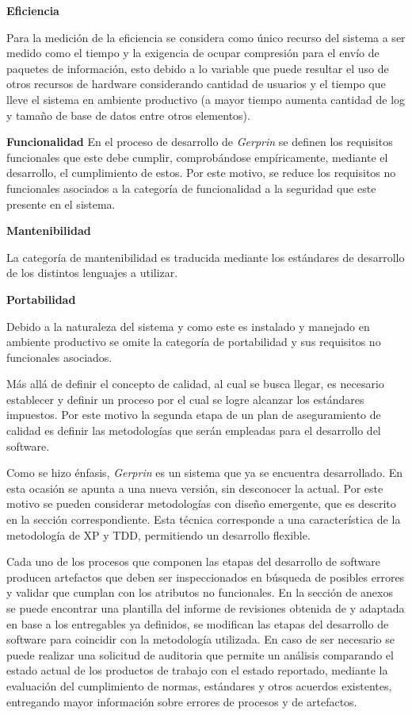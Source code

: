 \textbf{Eficiencia}

Para la medición de la eficiencia se considera como único recurso del sistema a ser medido como el tiempo y la exigencia de ocupar compresión para el envío de paquetes de información, esto debido a lo variable que puede resultar el uso de otros recursos de hardware considerando cantidad de usuarios y el tiempo que lleve el sistema en ambiente productivo (a mayor tiempo aumenta cantidad de log y tamaño de base de datos entre otros elementos).

\textbf{Funcionalidad}
En el proceso de desarrollo de \textit{Gerprin} se definen los requisitos funcionales que este debe cumplir, comprobándose empíricamente, mediante el desarrollo, el cumplimiento de estos. Por este motivo, se reduce los requisitos no funcionales asociados a la categoría de funcionalidad a la seguridad que este presente en el sistema.

\textbf{Mantenibilidad}

La categoría de mantenibilidad es traducida mediante los estándares de desarrollo de los distintos lenguajes a utilizar.

\textbf{Portabilidad}

Debido a la naturaleza del sistema y como este es instalado y manejado en ambiente productivo se omite la categoría de portabilidad y sus requisitos no funcionales asociados.

Más allá de definir el concepto de calidad, al cual se busca llegar, es necesario establecer y definir un proceso por el cual se logre alcanzar los estándares impuestos. Por este motivo la segunda etapa de un plan de aseguramiento de calidad es definir las metodologías que serán empleadas para el desarrollo del software.

Como se hizo énfasis, \textit{Gerprin} es un sistema que ya se encuentra desarrollado. En esta ocasión se apunta a una nueva versión, sin desconocer la actual. Por este motivo se pueden considerar metodologías con diseño emergente, que es descrito en la sección correspondiente. Esta técnica corresponde a una característica de la metodología de XP y TDD, permitiendo un desarrollo flexible.

Cada uno de los procesos que componen las etapas del desarrollo de software producen artefactos que deben ser inspeccionados en búsqueda de posibles errores y validar que cumplan con los atributos no funcionales. En la sección de anexos se puede encontrar una plantilla del informe de revisiones obtenida de \citet{web00} y adaptada en base a los entregables ya definidos, se modifican las etapas del desarrollo de software para coincidir con la metodología utilizada. En caso de ser necesario se puede realizar una solicitud de auditoria que permite un análisis comparando el estado actual de los productos de trabajo con el estado reportado, mediante la evaluación del cumplimiento de normas, estándares y otros acuerdos existentes, entregando mayor información sobre errores de procesos y de artefactos. 

